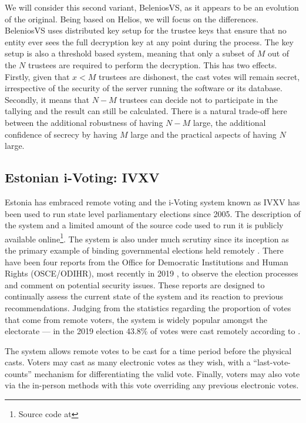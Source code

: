 We will consider this second variant, BeleniosVS, as it appears to be an evolution of the original. Being based on Helios, we will focus on the differences. BeleniosVS uses distributed key setup for the trustee keys that ensure that no entity ever sees the full decryption key at any point during the process. The key setup is also a threshold based system, meaning that only a subset of $M$ out of the $N$ trustees are required to perform the decryption. This has two effects. Firstly, given that $x < M$ trustees are dishonest, the cast votes will remain secret, irrespective of the security of the server running the software or its database. Secondly, it means that $N-M$ trustees can decide not to participate in the tallying and the result can still be calculated. There is a natural trade-off here between the additional robustness of having $N-M$ large, the additional confidence of secrecy by having $M$ large and the practical aspects of having $N$ large.

\subsection{Estonian i-Voting: IVXV}

Estonia has embraced remote voting and the i-Voting system known as IVXV has been used to run state level parliamentary elections since 2005. The description of the system and a limited amount of the source code used to run it is publicly available online\footnote{Source code at }. The system is also under much scrutiny since its inception as the primary example of binding governmental elections held remotely . There have been four reports from the Office for Democratic Institutions and Human Rights (OSCE/ODIHR), most recently in 2019 \cite{OSCEODIHRElection2019}, to observe the election processes and comment on potential security issues. These reports are designed to continually assess the current state of the system and its reaction to previous recommendations. Judging from the statistics regarding the proportion of votes that come from remote voters, the system is widely popular amongst the electorate --- in the 2019 election 43.8\% of votes were cast remotely according to \cite{OSCEODIHRElection2019}.

The system allows remote votes to be cast for a time period before the physical casts. Voters may cast as many electronic votes as they wish, with a ``last-vote-counts'' mechanism for differentiating the valid vote. Finally, voters may also vote via the in-person methods with this vote overriding any previous electronic votes.

